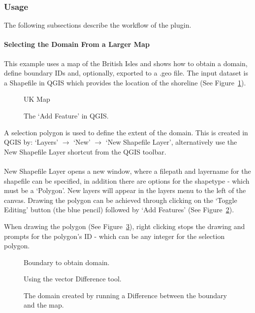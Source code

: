 	\subsubsection{Usage}
	The following subsections describe the workflow of the plugin.
		\paragraph{Selecting the Domain From a Larger Map\\}
		\label{sec:selectingDomain}
		This example uses a map of the British Isles and shows how to obtain a domain, define boundary IDs and, optionally, exported to a .geo file. The input dataset is a Shapefile in QGIS which provides the location of the shoreline (See Figure~\ref{fig:ukMap}).
		\begin{figure}[h!]
			\centering
			\caption{UK Map}
			\label{fig:ukMap}
		\end{figure}

		\begin{figure}[h!]
			\centering
			\caption{The `Add Feature' in QGIS.}
			\label{fig:addFeature}
		\end{figure}

		A selection polygon is used to define the extent of the domain. This is created in QGIS by: `Layers' $\rightarrow$ `New' $\rightarrow$ `New Shapefile Layer', alternatively use the New Shapefile Layer shortcut from the QGIS toolbar.\\ \\
		New Shapefile Layer opens a new window, where a filepath and layername for the shapefile can be specified, in addition there are options for the shapetype - which must be a `Polygon'.  New layers will appear in the layers menu to the left of the canvas. Drawing the polygon can be achieved through clicking on the `Toggle Editing' button (the blue pencil) followed by `Add Features' (See Figure~\ref{fig:addFeature}).

		When drawing the polygon (See Figure~\ref{fig:boundary}), right clicking stops the drawing and prompts for the polygon's ID - which can be any integer for the selection polygon.
		\begin{figure}[h!]
			\centering
			\caption{Boundary to obtain domain.}
			\label{fig:boundary}
		\end{figure}

		\begin{figure}[h!]
			\centering
			\caption{Using the vector Difference tool.}
			\label{fig:difference}
		\end{figure}
		\begin{figure}[h!]
			\centering
			\caption{The domain created by running a Difference between the boundary and the map.}
			\label{fig:domain}
		\end{figure}

